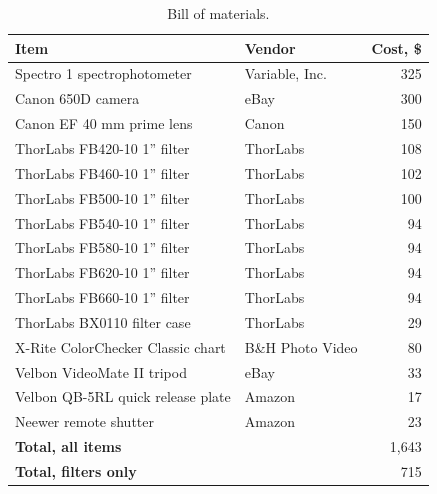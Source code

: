 \documentclass[twocolumn,10pt]{asme2ej}
\begin{document}
\begin{table}[t]
\begin{center}
\begin{tabular}{l l r}
\textbf{Item} & \textbf{Vendor} & \textbf{Cost, \$} \\
\hline
Spectro 1 spectrophotometer       & Variable, Inc. &   325 \\
Canon 650D camera                 & eBay &             300 \\
Canon EF 40 mm prime lens         & Canon &            150 \\
ThorLabs FB420-10 1'' filter      & ThorLabs &         108 \\
ThorLabs FB460-10 1'' filter      & ThorLabs &         102 \\
ThorLabs FB500-10 1'' filter      & ThorLabs &         100 \\
ThorLabs FB540-10 1'' filter      & ThorLabs &         94  \\
ThorLabs FB580-10 1'' filter      & ThorLabs &         94  \\
ThorLabs FB620-10 1'' filter      & ThorLabs &         94  \\
ThorLabs FB660-10 1'' filter      & ThorLabs &         94  \\
ThorLabs BX0110 filter case  & ThorLabs &         29  \\
X-Rite ColorChecker Classic chart         & B\&H Photo Video & 80  \\
Velbon VideoMate II tripod        & eBay &             33  \\
Velbon QB-5RL quick release plate & Amazon &           17  \\
Neewer remote shutter             & Amazon &           23  \\
\hline
\textbf{Total, all items} & & 1,643 \\
\textbf{Total, filters only} & & 715 \\
\end{tabular}
\caption{Bill of materials.}
\label{materials}
\end{center}
\end{table}
\end{document}
